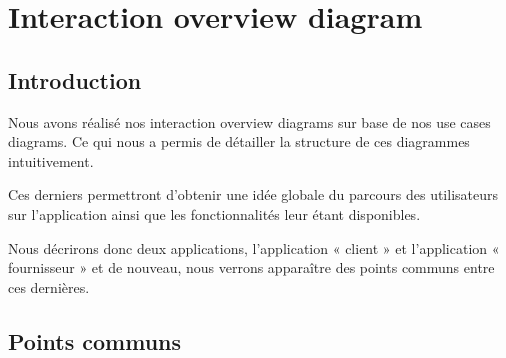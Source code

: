 \section{Interaction overview diagram}

\subsection{Introduction}

\begin{flushleft}
Nous avons réalisé nos interaction overview diagrams sur base de nos use cases diagrams. 
Ce qui nous a permis de détailler la structure de ces diagrammes intuitivement.
\end{flushleft}

\begin{flushleft}
Ces derniers permettront d’obtenir une idée globale du parcours des utilisateurs sur l’application ainsi que les fonctionnalités leur étant disponibles.
\end{flushleft}

\begin{flushleft}
Nous décrirons donc deux applications, l’application « client » et l’application « fournisseur » et de nouveau, nous verrons apparaître des points communs entre ces dernières.
\end{flushleft}

\newpage
\subsection{Points communs}

